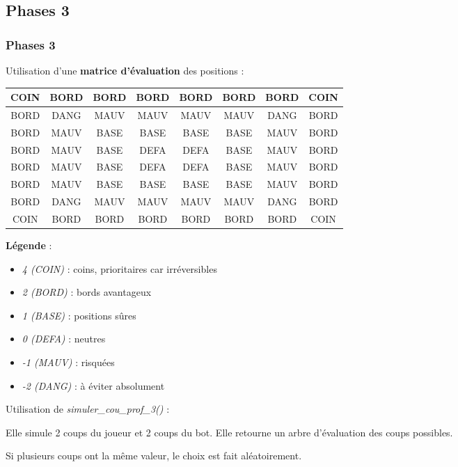 \documentclass[9pt]{beamer}
\begin{document}
\subsection{Phases 3}
\begin{frame}
  \frametitle{Phases 3}
  Utilisation d’une \textbf{matrice d’évaluation} des positions :

  \begin{tabular}{|c|c|c|c|c|c|c|c|}
    \hline
    COIN & BORD & BORD & BORD & BORD & BORD & BORD & COIN \\
    \hline
    BORD & DANG & MAUV & MAUV & MAUV & MAUV & DANG & BORD \\
    \hline
    BORD & MAUV & BASE & BASE & BASE & BASE & MAUV & BORD \\
    \hline
    BORD & MAUV & BASE & DEFA & DEFA & BASE & MAUV & BORD \\
    \hline
    BORD & MAUV & BASE & DEFA & DEFA & BASE & MAUV & BORD \\
    \hline
    BORD & MAUV & BASE & BASE & BASE & BASE & MAUV & BORD \\
    \hline
    BORD & DANG & MAUV & MAUV & MAUV & MAUV & DANG & BORD \\
    \hline
    COIN & BORD & BORD & BORD & BORD & BORD & BORD & COIN \\
    \hline
  \end{tabular}
  \textbf{Légende} :
  \begin{itemize}
    \item \textit{4 (COIN)} : coins, prioritaires car irréversibles
    \item \textit{2 (BORD)} : bords avantageux
    \item \textit{1 (BASE)} : positions sûres
    \item \textit{0 (DEFA)} : neutres
    \item \textit{-1 (MAUV)} : risquées
    \item \textit{-2 (DANG)} : à éviter absolument
  \end{itemize}
  Utilisation de \textit{simuler\_cou\_prof\_3()} :

Elle simule 2 coups du joueur et 2 coups du bot. Elle retourne un arbre d’évaluation des coups possibles.

Si plusieurs coups ont la même valeur, le choix est fait aléatoirement.
\end{frame}
\end{document}
